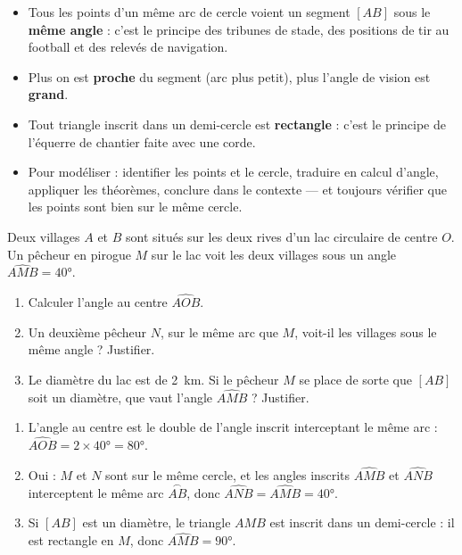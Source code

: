 \documentclass[11pt]{article}
\begin{document}
\begin{aretenir}
\begin{itemize}
\item Tous les points d'un même arc de cercle voient un segment $[AB]$ sous le \textbf{même angle} : c'est le principe des tribunes de stade, des positions de tir au football et des relevés de navigation.
\item Plus on est \textbf{proche} du segment (arc plus petit), plus l'angle de vision est \textbf{grand}.
\item Tout triangle inscrit dans un demi-cercle est \textbf{rectangle} : c'est le principe de l'équerre de chantier faite avec une corde.
\item Pour modéliser : identifier les points et le cercle, traduire en calcul d'angle, appliquer les théorèmes, conclure dans le contexte — et toujours vérifier que les points sont bien sur le même cercle.
\end{itemize}
\end{aretenir}

\begin{exercice}
Deux villages $A$ et $B$ sont situés sur les deux rives d'un lac circulaire de centre $O$. Un pêcheur en pirogue $M$ sur le lac voit les deux villages sous un angle $\widehat{AMB} = 40°$.
\begin{enumerate}
\item Calculer l'angle au centre $\widehat{AOB}$.
\item Un deuxième pêcheur $N$, sur le même arc que $M$, voit-il les villages sous le même angle ? Justifier.
\item Le diamètre du lac est de \SI{2}{\kilo\meter}. Si le pêcheur $M$ se place de sorte que $[AB]$ soit un diamètre, que vaut l'angle $\widehat{AMB}$ ? Justifier.
\end{enumerate}
\end{exercice}

\begin{corrige}[Exercice 1]
\begin{enumerate}
\item L'angle au centre est le double de l'angle inscrit interceptant le même arc : $\widehat{AOB} = 2\times 40° = 80°$.
\item Oui : $M$ et $N$ sont sur le même cercle, et les angles inscrits $\widehat{AMB}$ et $\widehat{ANB}$ interceptent le même arc $\overset{\frown}{AB}$, donc $\widehat{ANB} = \widehat{AMB} = 40°$.
\item Si $[AB]$ est un diamètre, le triangle $AMB$ est inscrit dans un demi-cercle : il est rectangle en $M$, donc $\widehat{AMB} = 90°$.
\end{enumerate}
\end{corrige}
\end{document}
